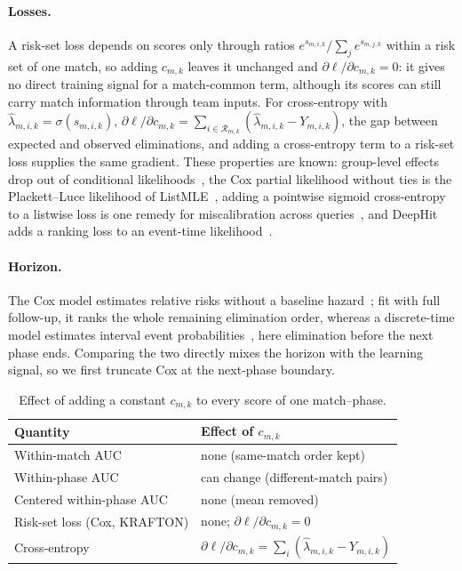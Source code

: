 \documentclass[sigconf,anonymous,nonacm]{acmart}
\begin{document}
\paragraph{Losses.}
A risk-set loss depends on scores only through ratios $e^{s_{m,i,k}}/\sum_{j}e^{s_{m,j,k}}$ within a risk set of one match, so adding $c_{m,k}$ leaves it unchanged and $\partial\ell/\partial c_{m,k}=0$: it gives no direct training signal for a match-common term, although its scores can still carry match information through team inputs. For cross-entropy with $\hat\lambda_{m,i,k}=\sigma(s_{m,i,k})$, $\partial\ell/\partial c_{m,k}=\sum_{i\in\mathcal{R}_{m,k}}(\hat\lambda_{m,i,k}-Y_{m,i,k})$, the gap between expected and observed eliminations, and adding a cross-entropy term to a risk-set loss supplies the same gradient. These properties are known: group-level effects drop out of conditional likelihoods~\cite{Chamberlain80}, the Cox partial likelihood without ties is the Plackett--Luce likelihood of ListMLE~\cite{Xia08}, adding a pointwise sigmoid cross-entropy to a listwise loss is one remedy for miscalibration across queries~\cite{Bai23}, and DeepHit adds a ranking loss to an event-time likelihood~\cite{DeepHit18}.

\paragraph{Horizon.}
The Cox model estimates relative risks without a baseline hazard~\cite{Cox72}; fit with full follow-up, it ranks the whole remaining elimination order, whereas a discrete-time model estimates interval event probabilities~\cite{SingerWillett93}, here elimination before the next phase ends. Comparing the two directly mixes the horizon with the learning signal, so we first truncate Cox at the next-phase boundary.

\begin{table}[t]
\centering\footnotesize
\caption{Effect of adding a constant $c_{m,k}$ to every score of one match--phase.}
\label{tab:account}
\setlength{\tabcolsep}{3pt}
\begin{tabular}{ll}
\toprule
Quantity & Effect of $c_{m,k}$ \\
\midrule
Within-match AUC & none (same-match order kept) \\
Within-phase AUC & can change (different-match pairs) \\
Centered within-phase AUC & none (mean removed) \\
Risk-set loss (Cox, KRAFTON) & none; $\partial\ell/\partial c_{m,k}=0$ \\
Cross-entropy & $\partial\ell/\partial c_{m,k}=\sum_{i}(\hat\lambda_{m,i,k}-Y_{m,i,k})$ \\
\bottomrule
\end{tabular}
\end{table}
\end{document}
